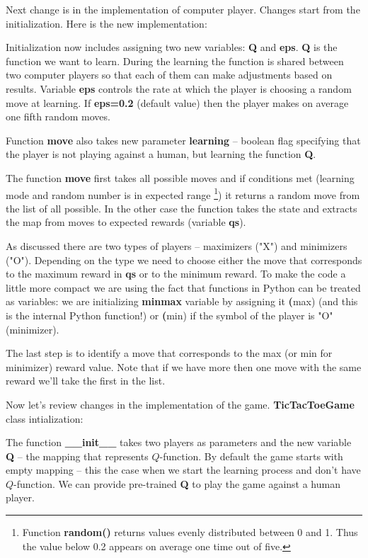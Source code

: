 Next change is in the implementation of computer player. Changes start from
the initialization. Here is the new implementation:

Initialization now includes assigning two new variables: \textbf{Q} and
\textbf{eps}. \textbf{Q} is the function we want to learn. During the
learning the function is shared between two computer players so that
each of them can make adjustments based on results. Variable \textbf{eps}
controls the rate at which the player is choosing a random move at learning.
If \textbf{eps=0.2} (default value) then the player makes on average
one fifth random moves.

Function \textbf{move} also takes new parameter \textbf{learning} --
boolean flag specifying that the player is not playing against a human,
but learning the function \textbf{Q}.

The function \textbf{move} first takes all possible moves and
if conditions met (learning mode and random number is in expected range
\footnote{Function \textbf{random()} returns values
evenly distributed between 0 and 1. Thus the value below 0.2 appears
on average one time out of five.}) it returns a random move from the
list of all possible.
In the other case the function takes the state and extracts the map
from moves to expected rewards (variable \textbf{qs}).

As discussed
there are two types of players -- maximizers ("X") and minimizers ("O").
Depending on the type we need to choose either the move that
corresponds to the maximum reward in \textbf{qs} or to the minimum
reward. To make the code a little more compact we are using the fact that
functions in Python can be treated as variables: we are initializing
\textbf{minmax} variable by assigning it \textbf(max) (and this
is the internal Python function!) or \textbf(min) if the 
symbol of the player is "O" (minimizer).

The last step is to identify a move that corresponds to the max (or min
for minimizer) reward value. Note that if we have more then one move with
the same reward we'll take the first in the list.

Now let's review changes in the implementation of the game.
\textbf{TicTacToeGame} class intialization:

The function \textbf{\_\_init\_\_} takes two players as parameters and
the new variable \textbf{Q} -- the mapping that represents $Q$-function.
By default the game starts with empty mapping -- this the case when we
start the learning process and don't have $Q$-function. We can provide
pre-trained \textbf{Q} to play the game against a human player.


